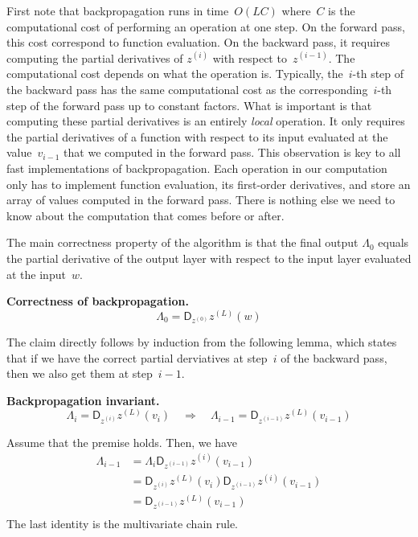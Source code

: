 \documentclass{tufte-book}
\begin{document}
First note that backpropagation runs in time~\(O(LC)\) where~\(C\) is
the computational cost of performing an operation at one step. On the
forward pass, this cost correspond to function evaluation. On the
backward pass, it requires computing the partial derivatives of
\(z^{(i)}\) with respect to~\(z^{(i-1)}\). The computational cost
depends on what the operation is. Typically, the~\(i\)-th step of the
backward pass has the same computational cost as the
corresponding~\(i\)-th step of the forward pass up to constant factors.
What is important is that computing these partial derivatives is an
entirely \emph{local} operation. It only requires the partial
derivatives of a function with respect to its input evaluated at the
value~\(v_{i-1}\) that we computed in the forward pass. This observation
is key to all fast implementations of backpropagation. Each operation in
our computation only has to implement function evaluation, its
first-order derivatives, and store an array of values computed in the
forward pass. There is nothing else we need to know about the
computation that comes before or after.

The main correctness property of the algorithm is that the final output
\(\Lambda_0\) equals the partial derivative of the output layer with
respect to the input layer evaluated at the input~\(w\).

\begin{Proposition}

\textbf{Correctness of backpropagation.} \[
\Lambda_0 = \mathsf{D}_{z^{(0)}} z^{(L)}(w)
\]

\end{Proposition}

The claim directly follows by induction from the following lemma, which
states that if we have the correct partial derviatives at step~\(i\) of
the backward pass, then we also get them at step~\(i-1.\)

\begin{Lemma}

\textbf{Backpropagation invariant.} \[
\Lambda_i = \mathsf{D}_{z^{(i)}} z^{(L)}(v_i)
\quad\Longrightarrow\quad
\Lambda_{i-1} = \mathsf{D}_{z^{(i-1)}} z^{(L)}(v_{i-1})
\]

\end{Lemma}

\begin{Proof}

Assume that the premise holds. Then, we have \[
\begin{aligned}
\Lambda_{i-1}
&=  \Lambda_i\mathsf{D}_{z^{(i-1)}} z^{(i)}(v_{i-1}) \\
& = \mathsf{D}_{z^{(i)}} z^{(L)}(v_i)
    \mathsf{D}_{z^{(i-1)}} z^{(i)}(v_{i-1}) \\
& = \mathsf{D}_{z^{(i-1)}} z^{(L)}(v_{i-1}) \\
\end{aligned}
\] The last identity is the multivariate chain rule.

\end{Proof}
\end{document}
